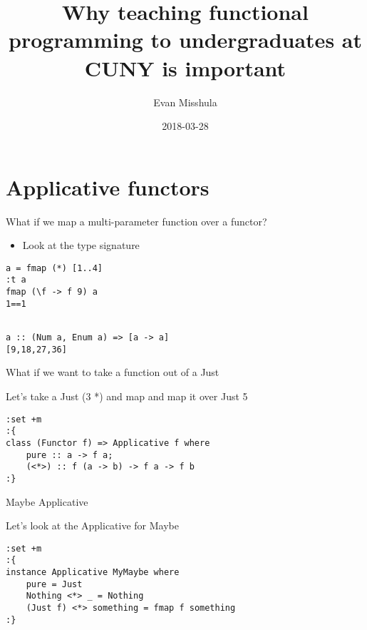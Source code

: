 \documentclass[presetation]{beamer}
\author{Evan Misshula}
\date{2018-03-28}
\title{Why teaching functional programming to undergraduates at CUNY is important}
\begin{document}
\maketitle

\section{Applicative functors}
\label{sec:org2513024}
\begin{frame}[fragile,label={sec:org7500da3}]{What if we map a multi-parameter function over a functor?}
 \begin{itemize}
\item Look at the type signature
\end{itemize}
\begin{verbatim}
a = fmap (*) [1..4]
:t a
fmap (\f -> f 9) a
1==1
\end{verbatim}

\begin{verbatim}

a :: (Num a, Enum a) => [a -> a]
[9,18,27,36]
\end{verbatim}
\end{frame}

\begin{frame}[fragile,label={sec:orgdcfb95f}]{What if we want to take a function out of a Just}
 \begin{block}{Let's take a Just (3 *) and map}
and map it over Just 5
\begin{verbatim}
:set +m
:{
class (Functor f) => Applicative f where
    pure :: a -> f a;
    (<*>) :: f (a -> b) -> f a -> f b
:}
\end{verbatim}
\end{block}
\end{frame}

\begin{frame}[fragile,label={sec:org8e7ac2e}]{Maybe Applicative}
 \begin{block}{Let's look at the Applicative for Maybe}
\begin{verbatim}
:set +m
:{
instance Applicative MyMaybe where
    pure = Just
    Nothing <*> _ = Nothing
    (Just f) <*> something = fmap f something
:}
\end{verbatim}
\end{block}
\end{frame}
\end{document}
